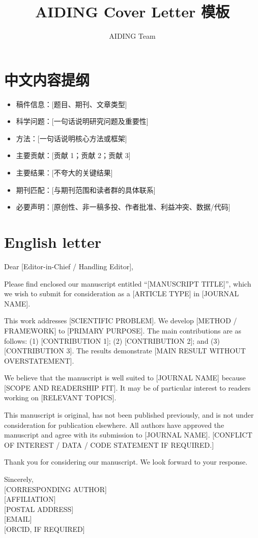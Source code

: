 \documentclass[UTF8,11pt]{ctexart}
\title{\textcolor{aidinggreen}{AIDING Cover Letter 模板}}
\author{AIDING Team}
\date{}
\newcommand{\placeholder}[1]{\textcolor{aidinggreen}{[#1]}}
\begin{document}
\maketitle
\section{中文内容提纲}
\begin{itemize}
\item 稿件信息：\placeholder{题目、期刊、文章类型}
\item 科学问题：\placeholder{一句话说明研究问题及重要性}
\item 方法：\placeholder{一句话说明核心方法或框架}
\item 主要贡献：\placeholder{贡献 1；贡献 2；贡献 3}
\item 主要结果：\placeholder{不夸大的关键结果}
\item 期刊匹配：\placeholder{与期刊范围和读者群的具体联系}
\item 必要声明：\placeholder{原创性、非一稿多投、作者批准、利益冲突、数据/代码}
\end{itemize}

\section{English letter}
\begin{flushleft}
Dear \placeholder{Editor-in-Chief / Handling Editor},

Please find enclosed our manuscript entitled ``\placeholder{MANUSCRIPT TITLE}'', which we wish to submit for consideration as a \placeholder{ARTICLE TYPE} in \placeholder{JOURNAL NAME}.

This work addresses \placeholder{SCIENTIFIC PROBLEM}. We develop \placeholder{METHOD / FRAMEWORK} to \placeholder{PRIMARY PURPOSE}. The main contributions are as follows: (1) \placeholder{CONTRIBUTION 1}; (2) \placeholder{CONTRIBUTION 2}; and (3) \placeholder{CONTRIBUTION 3}. The results demonstrate \placeholder{MAIN RESULT WITHOUT OVERSTATEMENT}.

We believe that the manuscript is well suited to \placeholder{JOURNAL NAME} because \placeholder{SCOPE AND READERSHIP FIT}. It may be of particular interest to readers working on \placeholder{RELEVANT TOPICS}.

This manuscript is original, has not been published previously, and is not under consideration for publication elsewhere. All authors have approved the manuscript and agree with its submission to \placeholder{JOURNAL NAME}. \placeholder{CONFLICT OF INTEREST / DATA / CODE STATEMENT IF REQUIRED.}

Thank you for considering our manuscript. We look forward to your response.

Sincerely,\\
\placeholder{CORRESPONDING AUTHOR}\\
\placeholder{AFFILIATION}\\
\placeholder{POSTAL ADDRESS}\\
\placeholder{EMAIL}\\
\placeholder{ORCID, IF REQUIRED}
\end{flushleft}
\end{document}
